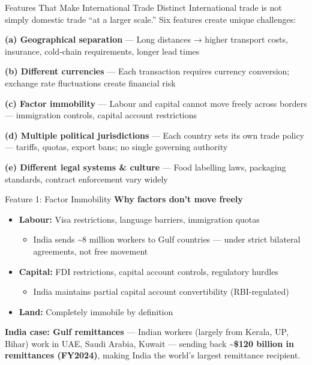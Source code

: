 \documentclass[
  ignorenonframetext,
  aspectratio=169,
]{beamer}
\makeatletter
\providecommand{\tightlist}{%
  \setlength{\itemsep}{0pt}\setlength{\parskip}{0pt}}
\let\quarto@originallabel\label
\DeclareRobustCommand*{\label}[1]{\quarto@originallabel{#1}}
\makeatother
\begin{document}
\begin{frame}{Features That Make International Trade Distinct}
\label{features-that-make-international-trade-distinct}
International trade is not simply domestic trade ``at a larger scale.''
Six features create unique challenges:

\textbf{(a) Geographical separation} --- Long distances → higher
transport costs, insurance, cold-chain requirements, longer lead times

\textbf{(b) Different currencies} --- Each transaction requires currency
conversion; exchange rate fluctuations create financial risk

\textbf{(c) Factor immobility} --- Labour and capital cannot move freely
across borders --- immigration controls, capital account restrictions

\textbf{(d) Multiple political jurisdictions} --- Each country sets its
own trade policy --- tariffs, quotas, export bans; no single governing
authority

\textbf{(e) Different legal systems \& culture} --- Food labelling laws,
packaging standards, contract enforcement vary widely

\end{frame}

\begin{frame}{Feature 1: Factor Immobility}
\label{feature-1-factor-immobility}
\textbf{Why factors don't move freely}

\begin{itemize}
\tightlist
\item
  \textbf{Labour:} Visa restrictions, language barriers, immigration
  quotas

  \begin{itemize}
  \tightlist
  \item
    India sends \textasciitilde8 million workers to Gulf countries ---
    under strict bilateral agreements, not free movement
  \end{itemize}
\item
  \textbf{Capital:} FDI restrictions, capital account controls,
  regulatory hurdles

  \begin{itemize}
  \tightlist
  \item
    India maintains partial capital account convertibility
    (RBI-regulated)
  \end{itemize}
\item
  \textbf{Land:} Completely immobile by definition
\end{itemize}

\textbf{India case: Gulf remittances} --- Indian workers (largely from
Kerala, UP, Bihar) work in UAE, Saudi Arabia, Kuwait --- sending back
\textbf{\textasciitilde\$120 billion in remittances (FY2024)}, making
India the world's largest remittance recipient.
\end{frame}
\end{document}
